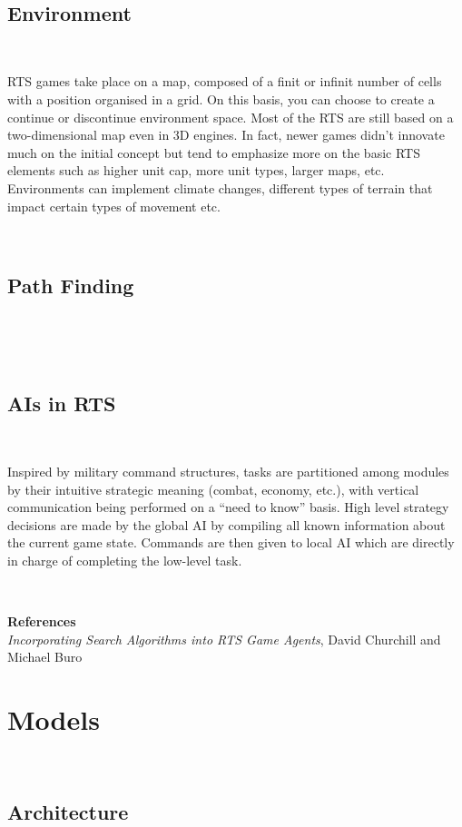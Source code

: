 \documentclass[a4paper,10pt]{book}
\begin{document}
~

\subsection{Environment}

~

RTS games take place on a map, composed of a finit or infinit number of cells with a position organised in a grid. On this basis,
you can choose to create a continue or discontinue environment space. Most of the RTS are still based on a two-dimensional map even 
in 3D engines. In fact, newer games didn't innovate much on the initial concept but tend to emphasize more on the basic RTS elements
such as higher unit cap, more unit types, larger maps, etc.
Environments can implement climate changes, different types of terrain that impact certain types of movement etc.

~


\subsection{Path Finding}

~



~

\subsection{AIs in RTS}

~

Inspired by  military command structures,  tasks are partitioned among modules
by their intuitive strategic meaning (combat, economy, etc.),
with vertical communication being performed on a “need to
know” basis.  High level strategy decisions are made by the
global AI by compiling all known information about
the current game state.  Commands are then given to local AI
which are directly in charge of completing the low-level task.

~

\textbf{References} 
\textit{\\Incorporating Search Algorithms into RTS Game Agents},
David Churchill and Michael Buro

\section {Models}

~

\subsection{Architecture}
\end{document}
